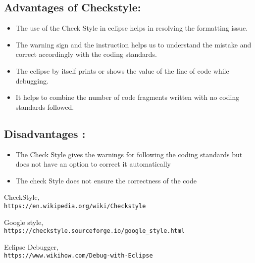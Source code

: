 \documentclass[12pt]{report}
\begin{document}
\subsection{Advantages of Checkstyle:}
\begin{itemize}
    \item The use of the Check Style in eclipse helps in resolving the formatting issue.
    \item The warning sign and the instruction helps us to understand the mistake and correct accordingly with the coding standards.
    \item The eclipse by itself prints or shows the value of the line of code while debugging.
    \item It helps to combine the number of code fragments written with no coding standards followed. 
   \end{itemize}

\subsection{Disadvantages :}
\begin{itemize}
    \item The Check Style gives the warnings for following the coding standards but does not have an option to correct it automatically
    \item The  check Style does not ensure the correctness of the code
\end{itemize}
\begin{thebibliography}{9}
CheckStyle,
\\\texttt{https://en.wikipedia.org/wiki/Checkstyle}

Google style,
\\\texttt{https://checkstyle.sourceforge.io/google\_style.html}

Eclipse Debugger,
\\\texttt{https://www.wikihow.com/Debug-with-Eclipse}
\end{thebibliography}
\end{document}
